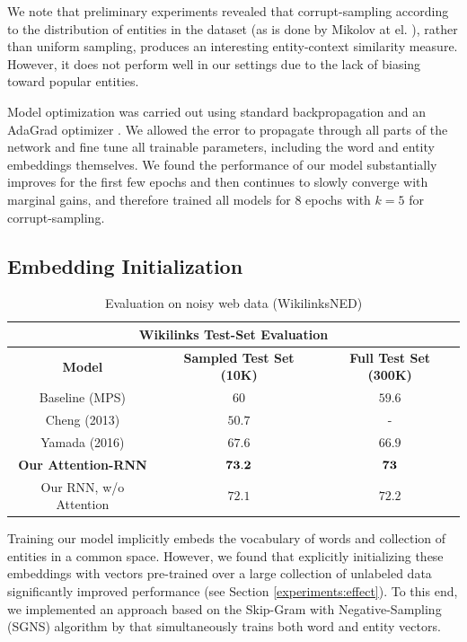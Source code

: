 \documentclass[11pt,letterpaper]{article}
\begin{document}
	We note that preliminary experiments revealed that corrupt-sampling according to the distribution of entities in the dataset (as is done by Mikolov at el. ), rather than uniform sampling, produces an interesting entity-context similarity measure. However, it does not perform well in our settings due to the lack of biasing toward popular entities.
	
	Model optimization was carried out using standard backpropagation and an AdaGrad optimizer \cite{duchi2011adaptive}. We allowed the error to propagate through all parts of the network and fine tune all trainable parameters, including the word and entity embeddings themselves. We found the performance of our model substantially improves for the first few epochs and then continues to slowly converge with marginal gains, and therefore trained all models for $8$ epochs with $k=5$ for corrupt-sampling. 
	
	\subsection{Embedding Initialization}
	
	\begin{table}[t]
		\begin{center}
			\begin{tabular}{|c| c | c | }
				\hline \multicolumn{3}{|c|}{Wikilinks Test-Set Evaluation} \\
				\hline \bf Model               & \bf Sampled Test Set (10K)  & \bf Full Test Set (300K)  \\
				\hline Baseline (MPS)                 & $60$   & $59.6$ \\
				Cheng (2013)                   & $50.7$ & - \\
				Yamada (2016)              & $67.6$ & $66.9$ \\
				\hline
				\bf Our Attention-RNN              & $\bf 73.2$ & $\bf 73$ \\
				Our RNN, w/o Attention         & $72.1$   & $72.2$ \\
				\hline
			\end{tabular}
		\end{center}
		\caption{\label{tab:wikilink} Evaluation on noisy web data (WikilinksNED)}
	\end{table}
	
	Training our model implicitly embeds the vocabulary of words and collection of entities in a common space. However, we found that explicitly initializing these embeddings with vectors pre-trained over a large collection of unlabeled data significantly improved performance (see Section \ref{experiments:effect}). To this end, we implemented an approach based on the Skip-Gram with Negative-Sampling (SGNS) algorithm by  that simultaneously trains both word and entity vectors.
	
\end{document}
